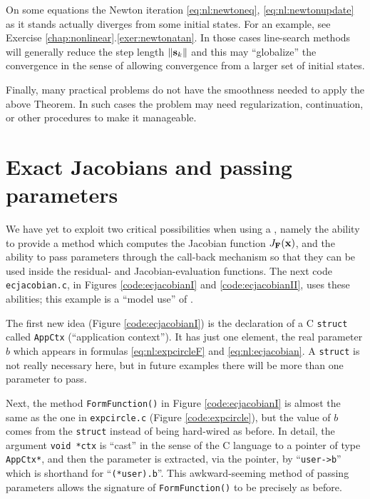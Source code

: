 On some equations the Newton iteration \eqref{eq:nl:newtoneq}, \eqref{eq:nl:newtonupdate} as it stands actually diverges from some initial states.  For an example, see Exercise \ref{chap:nonlinear}.\ref{exer:newtonatan}.  In those cases line-search methods will generally reduce the step length $\|\mathbf{s}_k\|$ and this may ``globalize'' the convergence \citep{Kelley2003} in the sense of allowing convergence from a larger set of initial states.

Finally, many practical problems do not have the smoothness needed to apply the above Theorem.  In such cases the problem may need regularization, continuation, or other procedures to make it manageable.


\section{Exact Jacobians and passing parameters}

We have yet to exploit two critical possibilities when using a \pSNES, namely the ability to provide a method which computes the Jacobian function $J_{\mathbf{F}}(\mathbf{x})$, and the ability to pass parameters through the call-back mechanism so that they can be used inside the residual- and Jacobian-evaluation functions.  The next code \texttt{ecjacobian.c}, in Figures \ref{code:ecjacobianI} and \ref{code:ecjacobianII}, uses these abilities; this example is a ``model use'' of \pSNES.

The first new idea (Figure \ref{code:ecjacobianI}) is the declaration of a C \texttt{struct} called \texttt{AppCtx} (``application context'').  It has just one element, the real parameter $b$ which appears in formulas \eqref{eq:nl:expcircleF} and \eqref{eq:nl:ecjacobian}.  A \texttt{struct} is not really necessary here, but in future examples there will be more than one parameter to pass.

Next, the method \texttt{FormFunction()} in Figure \ref{code:ecjacobianI} is almost the same as the one in \texttt{expcircle.c} (Figure \ref{code:expcircle}), but the value of $b$ comes from the \texttt{struct} instead of being hard-wired as before.  In detail, the argument \texttt{void *ctx} is ``cast'' in the sense of the C language \citep{KernighanRitchie1988} to a pointer of type \texttt{AppCtx*}, and then the parameter is extracted, via the pointer, by ``\texttt{user->b}'' which is shorthand for ``\texttt{(*user).b}''.  This awkward-seeming method of passing parameters allows the signature of \texttt{FormFunction()} to be precisely as before.

